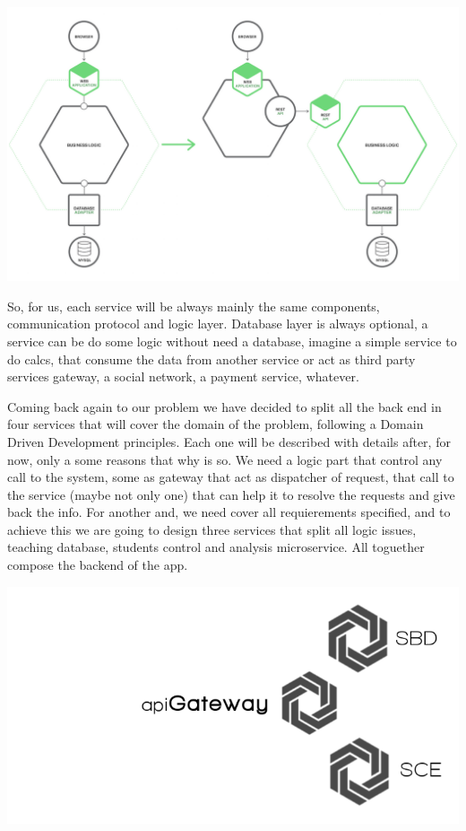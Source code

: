 \begin{center}
\includegraphics[scale=0.4]{img/graphics/refactoring.png}
\end{center}

So, for us, each service will be always mainly the same components,
communication protocol and logic layer. Database layer is always optional,
a service can be do some logic without need a database, imagine a simple service
to do calcs, that consume the data from another service or act as third party
services gateway, a social network, a payment service, whatever.

Coming back again to our problem we have decided to split all the back end in
four services that will cover the domain of the problem, following a Domain
Driven Development principles. Each one will be described with details after,
for now, only a some reasons that why is so. We need a logic part that control
any call to the system, some as gateway that act as dispatcher of request, that
call to the service (maybe not only one) that can help it to resolve the requests
and give back the info. For another and, we need cover all requierements specified,
and to achieve this we  are going to design three services that split all logic
issues, teaching database, students control and analysis microservice. All toguether
compose the backend of the app.

\begin{center}
\includegraphics[scale=0.3]{img/graphics/backend.png}
\end{center}

